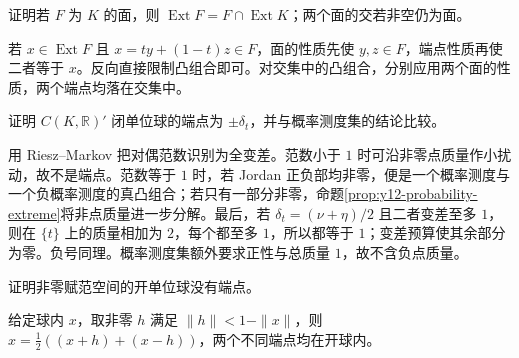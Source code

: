 \begin{exercise}[面中的端点]\label{ex:y12-face}
证明若 $F$ 为 $K$ 的面，则 $\operatorname{Ext}F=F\cap\operatorname{Ext}K$；两个面的交若非空仍为面。
\end{exercise}
\begin{solution}
若 $x\in\operatorname{Ext}F$ 且 $x=ty+(1-t)z\in F$，面的性质先使 $y,z\in F$，端点性质再使二者等于 $x$。反向直接限制凸组合即可。对交集中的凸组合，分别应用两个面的性质，两个端点均落在交集中。
\end{solution}

\begin{exercise}[有符号测度球]\label{ex:y12-signed-extreme}
证明 $C(K,\mathbb R)'$ 闭单位球的端点为 $\pm\delta_t$，并与概率测度集的结论比较。
\end{exercise}
\begin{solution}
用 Riesz--Markov 把对偶范数识别为全变差。范数小于 $1$ 时可沿非零点质量作小扰动，故不是端点。范数等于 $1$ 时，若 Jordan 正负部均非零，便是一个概率测度与一个负概率测度的真凸组合；若只有一部分非零，命题\ref{prop:y12-probability-extreme}将非点质量进一步分解。最后，若 $\delta_t=(\nu+\eta)/2$ 且二者变差至多 $1$，则在 $\{t\}$ 上的质量相加为 $2$，每个都至多 $1$，所以都等于 $1$；变差预算使其余部分为零。负号同理。概率测度集额外要求正性与总质量 $1$，故不含负点质量。
\end{solution}

\begin{exercise}[紧性不可省略]\label{ex:y12-open-ball}
证明非零赋范空间的开单位球没有端点。
\end{exercise}
\begin{solution}
给定球内 $x$，取非零 $h$ 满足 $\|h\|<1-\|x\|$，则 $x=\tfrac12((x+h)+(x-h))$，两个不同端点均在开球内。
\end{solution}

